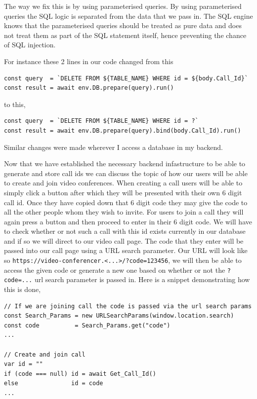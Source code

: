 The way we fix this is by using parameterised queries.
By using parameterised queries the SQL logic is separated 
from the data that we pass in. The SQL engine knows that the
parameterised queries should be treated as pure data
and does not treat them as part of the SQL statement itself,
hence preventing the chance of SQL injection. \\ \vspace{0.2cm}

For instance these 2 lines in our code changed from this

\begin{verbatim}
const query  = `DELETE FROM ${TABLE_NAME} WHERE id = ${body.Call_Id}`
const result = await env.DB.prepare(query).run()
\end{verbatim}

to this,

\begin{verbatim}
const query  = `DELETE FROM ${TABLE_NAME} WHERE id = ?`
const result = await env.DB.prepare(query).bind(body.Call_Id).run()
\end{verbatim}

Similar changes were made wherever I access a database in my 
backend. \\ \vspace{0.2cm}

Now that we have established the necessary backend 
infastructure to be able to generate and store call 
ids we can discuss the topic of how our users 
will be able to create and join video conferences. 
When creating a call users will be able to simply
click a button after which they will be presented 
with their own 6 digit call id. Once they have copied 
down that 6 digit code they may give the code to all
the other people whom they wish to invite. For users 
to join a call they will again press a button and then 
proceed to enter in their 6 digit code. We will have
to check whether or not such a call with this id
exists currently in our database and if so we will 
direct to our video call page. The code that they enter
will be passed into our call page using a URL search
parameter. Our URL will look like so 
\texttt{https://video-conferencer.<...>/?code=123456},
we will then be able to access the given code or generate a 
new one based on whether or not the \texttt{?code=...} url 
search parameter is passed in. Here is a snippet demonstrating
how this is done,

\begin{verbatim}
// If we are joining call the code is passed via the url search params
const Search_Params = new URLSearchParams(window.location.search)
const code          = Search_Params.get("code")
...

// Create and join call
var id = ""
if (code === null) id = await Get_Call_Id()
else               id = code
...
\end{verbatim}

